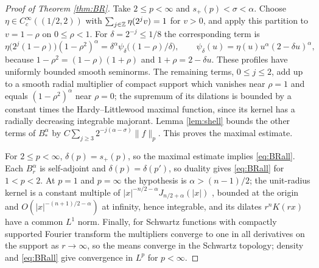 \begin{proof}[Proof of Theorem \ref{thm:BR}]
Take $2\le p<\infty$ and $s_+(p)<\sigma<\alpha$. Choose $\eta\in C_c^\infty((1/2,2))$ with
$\sum_{j\in\mathbb{Z}}\eta(2^jv)=1$ for $v>0$, and apply this partition to $v=1-\rho$ on $0\le\rho<1$. For
$\delta=2^{-j}\le1/8$ the corresponding term is
\[
\eta\bigl(2^j(1-\rho)\bigr)(1-\rho^2)^\alpha=\delta^\alpha\psi_\delta\bigl((1-\rho)/\delta\bigr),\qquad
\psi_\delta(u)=\eta(u)u^\alpha(2-\delta u)^\alpha ,
\]
because $1-\rho^2=(1-\rho)(1+\rho)$ and $1+\rho=2-\delta u$. These profiles have uniformly bounded
smooth seminorms. The remaining terms, $0\le j\le2$, add up to a smooth radial multiplier of compact
support which vanishes near $\rho=1$ and equals $(1-\rho^2)^\alpha$ near $\rho=0$; the supremum of its
dilations is bounded by a constant times the Hardy--Littlewood maximal function, since its kernel
has a radially decreasing integrable majorant. Lemma \ref{lem:shell} bounds the other terms of
$B^\alpha_*$ by $C\sum_{j\ge3}2^{-j(\alpha-\sigma)}\|f\|_p$. This proves the maximal estimate.

For $2\le p<\infty$, $\delta(p)=s_+(p)$, so the maximal estimate implies \eqref{eq:BRall}. Each $B^\alpha_r$
is self-adjoint and $\delta(p)=\delta(p')$, so duality gives \eqref{eq:BRall} for $1<p<2$. At $p=1$ and
$p=\infty$ the hypothesis is $\alpha>(n-1)/2$; the unit-radius kernel is a constant multiple of
$|x|^{-n/2-\alpha}J_{n/2+\alpha}(|x|)$ \cite[Ch.~IX]{Ste93}, bounded at the origin and
$O(|x|^{-(n+1)/2-\alpha})$ at infinity, hence integrable, and its dilates $r^nK(rx)$ have a common $L^1$
norm. Finally, for Schwartz functions with compactly supported Fourier transform the multipliers
converge to one in all derivatives on the support as $r\to\infty$, so the means converge in the
Schwartz topology; density and \eqref{eq:BRall} give convergence in $L^p$ for $p<\infty$.
\end{proof}
